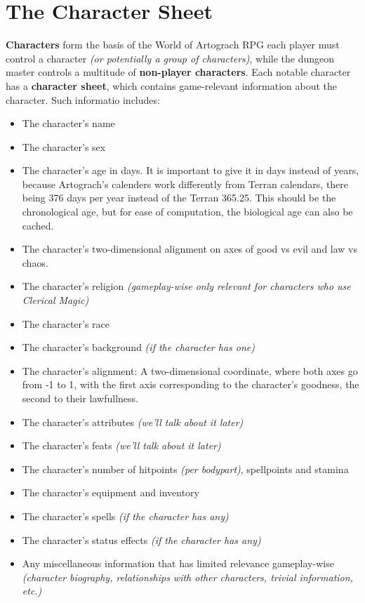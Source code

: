 \chapter{The Character Sheet}
\textbf{Characters} form the basis of the World of Artograch RPG \textemdash each player must control a character \textit{(or potentially a group of characters)}, while the dungeon master controls a multitude of \textbf{non-player characters}. Each notable character has a \textbf{character sheet}, which contains game-relevant information about the character. Such informatio includes:
\begin{itemize}
\item The character's name
\item The character's sex
\item The character's age in days. It is important to give it in days instead of years, because Artograch's calenders work differently from Terran calendars, there being 376 days per year instead of the Terran 365.25. This should be the chronological age, but for ease of computation, the biological age can also be cached.
\item The character's two-dimensional alignment on axes of good vs evil and law vs chaos.
\item The character's religion \textit{(gameplay-wise only relevant for characters who use Clerical Magic)}
\item The character's race
\item The character's background \textit{(if the character has one)}
\item The character's alignment: A two-dimensional coordinate, where both axes go from -1 to 1, with the first axis corresponding to the character's goodness, the second to their lawfullness.
\item The character's attributes \textit{(we'll talk about it later)}
\item The character's feats \textit{(we'll talk about it later)}
\item The character's number of hitpoints \textit{(per bodypart)}, spellpoints and stamina
\item The character's equipment and inventory
\item The character's spells \textit{(if the character has any)}
\item The character's status effects \textit{(if the character has any)}
\item Any miscellaneous information that has limited relevance gameplay-wise \textit{(character biography, relationships with other characters, trivial information, etc.)}
\end{itemize}
\pagebreak
